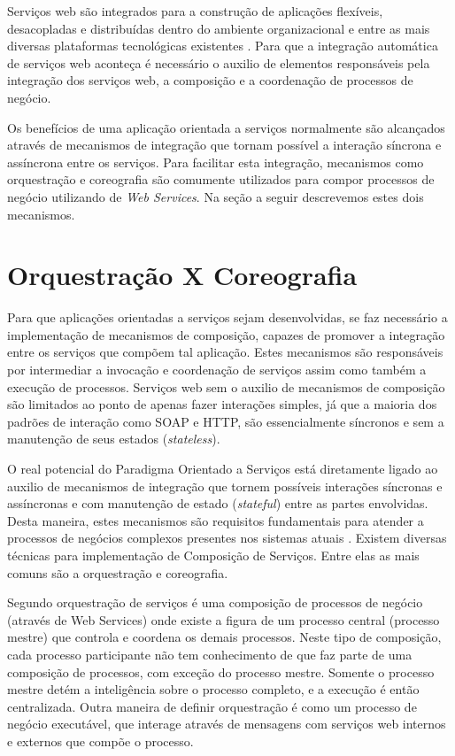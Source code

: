 Serviços web são integrados para a construção de aplicações flexíveis, desacopladas e distribuídas dentro do ambiente organizacional e entre as mais diversas plataformas tecnológicas existentes \cite{papazoglouSOC:2007}. Para que a integração automática de serviços web aconteça é necessário o auxilio de elementos responsáveis pela integração dos serviços web, a composição e a coordenação de processos de negócio. 

Os benefícios de uma aplicação orientada a serviços normalmente são alcançados através de mecanismos de integração que tornam possível a interação síncrona e assíncrona entre os serviços. Para facilitar esta integração, mecanismos como orquestração e coreografia são  comumente utilizados para compor processos de negócio utilizando de \textit{Web Services}. Na seção a seguir descrevemos estes dois mecanismos.

\section{Orquestração X Coreografia}

Para que aplicações orientadas a serviços sejam desenvolvidas, se faz necessário a implementação de mecanismos de composição, capazes de promover a integração entre os serviços que compõem tal aplicação. Estes mecanismos são responsáveis por intermediar a invocação e coordenação de serviços assim como também a execução de processos. Serviços web sem o auxilio de mecanismos de composição são limitados ao ponto de apenas fazer interações simples, já que a maioria dos padrões de interação como SOAP e HTTP, são essencialmente síncronos e sem a manutenção de seus estados (\textit{stateless}).

O real potencial do Paradigma Orientado a Serviços está diretamente ligado ao auxilio de mecanismos de integração que tornem possíveis interações síncronas e assíncronas e com manutenção de estado (\textit{stateful}) entre as partes envolvidas. Desta maneira, estes mecanismos são requisitos fundamentais para atender a processos de negócios complexos presentes nos sistemas atuais \cite{Dustdar:2008}. Existem diversas técnicas para implementação de Composição de Serviços. Entre elas as mais comuns são a orquestração e coreografia.  

Segundo \cite{Papazoglou:2006} orquestração de serviços é uma composição de processos de negócio (através de Web Services) onde existe a figura de um processo central (processo mestre) que controla e coordena os demais processos. Neste tipo de composição, cada processo participante não tem conhecimento de que faz parte de uma composição de processos, com exceção do processo mestre. Somente o processo mestre detém a inteligência sobre o processo completo, e a execução é então centralizada. Outra maneira de definir orquestração é como um processo de negócio executável, que interage através de mensagens com serviços web internos e externos que compõe o processo. 

